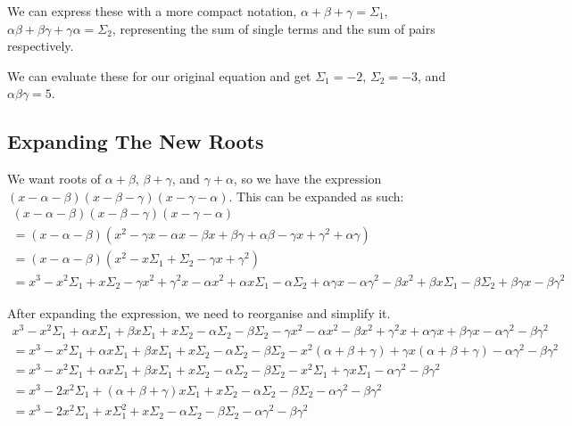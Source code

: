 \documentclass[a4paper]{article}
\newcommand{\ab}{\alpha\beta}
\newcommand{\bg}{\beta\gamma}
\newcommand{\ag}{\alpha\gamma}
\newcommand{\sone}{\alpha + \beta + \gamma}
\newcommand{\stwo}{\alpha\beta + \beta\gamma + \gamma\alpha}
\newcommand{\abg}{\alpha\beta\gamma}
\newcommand{\Sone}{\Sigma_1}
\newcommand{\Stwo}{\Sigma_2}
\begin{document}
We can express these with a more compact notation, $\sone = \Sone$, $\stwo = \Stwo$, representing the sum of single terms and the sum of pairs respectively.

We can evaluate these for our original equation and get $\Sone = -2$, $\Stwo = -3$, and $\abg = 5$.

\subsection{Expanding The New Roots}

We want roots of $\alpha + \beta$, $\beta + \gamma$, and $\gamma + \alpha$, so we have the expression $(x - \alpha - \beta)(x - \beta - \gamma)(x - \gamma - \alpha)$. This can be expanded as such:
\begin{gather*}
(x - \alpha - \beta)(x - \beta - \gamma)(x - \gamma - \alpha)\\[0.5em]
= (x - \alpha - \beta)(x^2 - \gamma x - \alpha x - \beta x + \bg + \ab - \gamma x + \gamma^2 + \ag)\\[0.5em]
= (x - \alpha - \beta)(x^2 - x\Sone + \Stwo - \gamma x + \gamma^2)\\[0.5em]
= x^3 - x^2\Sone + x\Stwo - \gamma x^2 + \gamma^2 x - \alpha x^2 + \alpha x\Sone - \alpha \Stwo + \ag x - \ag^2 - \beta x^2 + \beta x\Sone - \beta\Stwo + \bg x - \bg^2
\end{gather*}

After expanding the expression, we need to reorganise and simplify it.
\begin{gather*}
x^3  - x^2\Sone + \alpha x\Sone + \beta x\Sone+ x\Stwo - \alpha\Stwo - \beta\Stwo - \gamma x^2 - \alpha x^2 - \beta x^2 + \gamma^2 x + \ag x + \bg x - \ag^2 - \bg^2\\[0.5em]
= x^3  - x^2\Sone + \alpha x\Sone + \beta x\Sone+ x\Stwo - \alpha\Stwo - \beta\Stwo - x^2(\sone) + \gamma x(\sone) - \ag^2 - \bg^2\\[0.5em]
= x^3  - x^2\Sone + \alpha x\Sone + \beta x\Sone + x\Stwo - \alpha\Stwo - \beta\Stwo - x^2\Sone + \gamma x\Sone - \ag^2 - \bg^2\\[0.5em]
= x^3 - 2x^2\Sone + (\sone)x\Sone + x\Stwo - \alpha\Stwo - \beta\Stwo - \ag^2 - \bg^2\\[0.5em]
= x^3 - 2x^2\Sone + x\Sone^2 + x\Stwo - \alpha\Stwo - \beta\Stwo - \ag^2 - \bg^2
\end{gather*}
\end{document}
